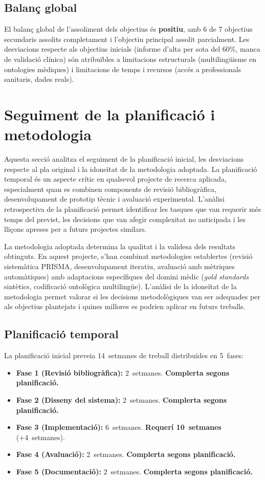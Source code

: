 \documentclass[CAT]{TFUOC}%
\begin{document}
\subsection{Balanç global}

El balanç global de l'assoliment dels objectius és \textbf{positiu}, amb 6 de 7 objectius secundaris assolits completament i l'objectiu principal assolit parcialment. Les desviacions respecte als objectius inicials (informe d'alta per sota del 60\%, manca de validació clínica) són atribuïbles a limitacions estructurals (multilingüisme en ontologies mèdiques) i limitacions de temps i recursos (accés a professionals sanitaris, dades reals).

\section{Seguiment de la planificació i metodologia}

Aquesta secció analitza el seguiment de la planificació inicial, les desviacions respecte al pla original i la idoneïtat de la metodologia adoptada. La planificació temporal és un aspecte crític en qualsevol projecte de recerca aplicada, especialment quan es combinen components de revisió bibliogràfica, desenvolupament de prototip tècnic i avaluació experimental. L'anàlisi retrospectiva de la planificació permet identificar les tasques que van requerir més temps del previst, les decisions que van afegir complexitat no anticipada i les lliçons apreses per a futurs projectes similars.

La metodologia adoptada determina la qualitat i la validesa dels resultats obtinguts. En aquest projecte, s'han combinat metodologies establertes (revisió sistemàtica PRISMA, desenvolupament iteratiu, avaluació amb mètriques automàtiques) amb adaptacions específiques del domini mèdic (\textit{gold standards} sintètics, codificació ontològica multilingüe). L'anàlisi de la idoneïtat de la metodologia permet valorar si les decisions metodològiques van ser adequades per als objectius plantejats i quines millores es podrien aplicar en futurs treballs.

\subsection{Planificació temporal}

La planificació inicial preveia 14~setmanes de treball distribuïdes en 5~fases:

\begin{itemize}
    \item \textbf{Fase 1 (Revisió bibliogràfica):} 2~setmanes. \textbf{Complerta segons planificació.}
    \item \textbf{Fase 2 (Disseny del sistema):} 2~setmanes. \textbf{Complerta segons planificació.}
    \item \textbf{Fase 3 (Implementació):} 6~setmanes. \textbf{Requerí 10~setmanes} (+4~setmanes).
    \item \textbf{Fase 4 (Avaluació):} 2~setmanes. \textbf{Complerta segons planificació.}
    \item \textbf{Fase 5 (Documentació):} 2~setmanes. \textbf{Complerta segons planificació.}
\end{itemize}
\end{document}
